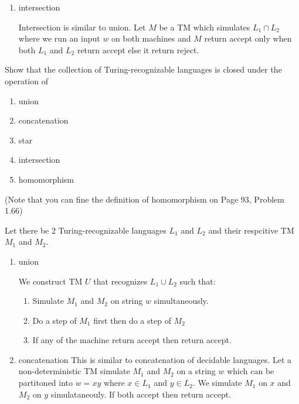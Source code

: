\documentclass[12pt]{exam}
\begin{document}
\begin{questions}
\begin{solution}
\begin{enumerate}
      \item intersection

            Intersection is similar to union. Let $M$ be a TM which simulates $L_{1}\cap L_{2}$  where we run an input $w$ on both machines and $M$ return accept only when both $L_{1}$ and $L_{2}$ return accept else it return reject.

    \end{enumerate}

  \end{solution}
  \question{} %
  Show that the collection of Turing-recognizable languages is closed under the operation of

  \begin{multicols}{2}
  \begin{enumerate}
    \item union
    \item concatenation
    \item star
    \item intersection
    \item homomorphism
  \end{enumerate}
  \end{multicols}

  (Note that you can fine the definition of homomorphism on Page 93, Problem 1.66)


  \begin{solution}
    Let there be 2 Turing-recognizable languages $L_{1}$ and $L_{2}$ and their respcitive TM $M_{1}$ and $M_{2}$.
    \begin{enumerate}
      \item union

            We construct TM $U$ that recognizes $L_{1}\cup L_{2}$ such that:
            \begin{enumerate}[1.]
              \item Simulate $M_{1}$ and $M_{2}$ on string $w$ simultaneously.
              \item Do a step of $M_{1}$ first then do a step of $M_{2}$
              \item If any of the machine return accept then return accept.
            \end{enumerate}


      \item concatenation
            This is similar to concatenation of decidable languages. Let a non-deterministic TM simulate $M_{1}$ and $M_{2}$ on a string $w$ which can be partitoned into $w=xy$ where $x\in L_{1}$ and $y\in L_{2}$.
            We simulate $M_{1}$ on $x$ and $M_{2}$ on $y$ simulataneouly. If both accept then return accept.


\end{enumerate}
\end{solution}
\end{questions}
\end{document}
